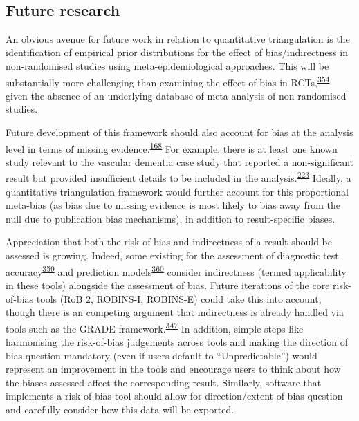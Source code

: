 \documentclass[a4paper, twoside]{templates/ociamthesis}
\begin{document}
~

\hypertarget{future-research}{%
\subsection{Future research}\label{future-research}}

An obvious avenue for future work in relation to quantitative triangulation is the identification of empirical prior distributions for the effect of bias/indirectness in non-randomised studies using meta-epidemiological approaches. This will be substantially more challenging than examining the effect of bias in RCTs,\textsuperscript{\protect\hyperlink{ref-savovic2018}{354}} given the absence of an underlying database of meta-analysis of non-randomised studies.

Future development of this framework should also account for bias at the analysis level in terms of missing evidence.\textsuperscript{\protect\hyperlink{ref-zotero-15123}{168}} For example, there is at least one known study relevant to the vascular dementia case study that reported a non-significant result but provided insufficient details to be included in the analysis.\textsuperscript{\protect\hyperlink{ref-chiang2007}{223}} Ideally, a quantitative triangulation framework would further account for this proportional meta-bias (as bias due to missing evidence is most likely to bias away from the null due to publication bias mechanisms), in addition to result-specific biases.

Appreciation that both the risk-of-bias and indirectness of a result should be assessed is growing. Indeed, some existing for the assessment of diagnostic test accuracy\textsuperscript{\protect\hyperlink{ref-whiting2011}{359}} and prediction models\textsuperscript{\protect\hyperlink{ref-moons2019}{360}} consider indirectness (termed applicability in these tools) alongside the assessment of bias. Future iterations of the core risk-of-bias tools (RoB 2, ROBINS-I, ROBINS-E) could take this into account, though there is an competing argument that indirectness is already handled via tools such as the GRADE framework.\textsuperscript{\protect\hyperlink{ref-guyatt2011}{347}} In addition, simple steps like harmonising the risk-of-bias judgements across tools and making the direction of bias question mandatory (even if users default to ``Unpredictable'') would represent an improvement in the tools and encourage users to think about how the biases assessed affect the corresponding result. Similarly, software that implements a risk-of-bias tool should allow for direction/extent of bias question and carefully consider how this data will be exported.
\end{document}
